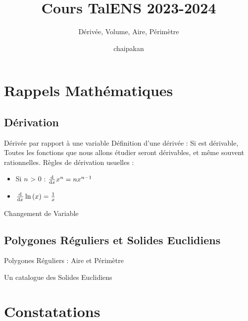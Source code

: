 \documentclass{beamercours}
\title{Cours TalENS 2023-2024}
\subtitle{Dérivée, Volume, Aire, Périmètre}
\date{chaipakan}
\begin{document}
\maketitle

    \section{Rappels Mathématiques}
        \subsection{Dérivation}
            \begin{frame}{Dérivée par rapport à une variable}
                Définition d'une dérivée : Si  est dérivable, 
                Toutes les fonctions que nous allons étudier seront dérivables, et même souvent rationnelles.
                Règles de dérivation usuelles : 
                \begin{itemize}
                    \item Si $n$ > 0 : $\frac{\mathrm{d}}{\mathrm{d}x}x^{n} = nx^{n-1}$
                    \item $\frac{\mathrm{d}}{\mathrm{d}x} \ln{(x)} = \frac{1}{x}$
                \end{itemize}
            \end{frame}

            
            \begin{frame}{Changement de Variable}   
                
            \end{frame}

        \subsection{Polygones Réguliers et Solides Euclidiens}
            \begin{frame}{Polygones Réguliers : Aire et Périmètre}
                
            \end{frame}
            \begin{frame}{Un catalogue des Solides Euclidiens}
                
            \end{frame}

    \section{Constatations}
\end{document}
